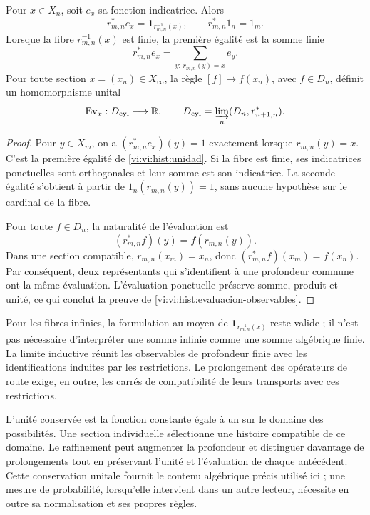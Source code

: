 \begin{lemma}
Pour \(x\in X_n\), soit \(e_x\) sa fonction indicatrice. Alors
\begin{equation}
 r_{m,n}^*e_x=\mathbf1_{r_{m,n}^{-1}(x)},\qquad
 r_{m,n}^*1_n=1_m.
 \label{vi:vi:hist:unidad}
\end{equation}
Lorsque la fibre \(r_{m,n}^{-1}(x)\) est finie, la première égalité est
la somme finie
\[
 r_{m,n}^*e_x=\sum_{y:\,r_{m,n}(y)=x}e_y.
\]
Pour toute section \(x=(x_n)\in X_\infty\), la règle
\([f]\mapsto f(x_n)\), avec \(f\in D_n\), définit un homomorphisme
unital
\begin{equation}
 \operatorname{Ev}_x:D_{\mathrm{cyl}}\longrightarrow\mathbb R,
 \qquad
 D_{\mathrm{cyl}}=\varinjlim_n(D_n,r_{n+1,n}^*).
 \label{vi:vi:hist:evaluacion-observables}
\end{equation}
\end{lemma}
\begin{proof}
Pour \(y\in X_m\), on a
\((r_{m,n}^*e_x)(y)=1\) exactement lorsque \(r_{m,n}(y)=x\).
C’est la première égalité de \eqref{vi:vi:hist:unidad}. Si la fibre est
finie, ses indicatrices ponctuelles sont orthogonales et leur somme est son indicatrice.
La seconde égalité s’obtient à partir de \(1_n(r_{m,n}(y))=1\), sans aucune
hypothèse sur le cardinal de la fibre.

Pour toute \(f\in D_n\), la naturalité de l’évaluation est
\[
 (r_{m,n}^*f)(y)=f(r_{m,n}(y)).
\]
Dans une section compatible, \(r_{m,n}(x_m)=x_n\), donc
\((r_{m,n}^*f)(x_m)=f(x_n)\). Par conséquent, deux représentants qui
s’identifient à une profondeur commune ont la même évaluation.
L’évaluation ponctuelle préserve somme, produit et unité, ce qui conclut
la preuve de \eqref{vi:vi:hist:evaluacion-observables}.
\end{proof}

Pour les fibres infinies, la formulation au moyen de
\(\mathbf1_{r_{m,n}^{-1}(x)}\) reste valide ; il n’est pas nécessaire d’interpréter une somme
infinie comme une somme algébrique finie. La limite inductive réunit les
observables de profondeur finie avec les identifications induites par
les restrictions. Le prolongement des opérateurs de route exige, en outre,
les carrés de compatibilité de leurs transports avec ces restrictions.

L’unité conservée est la fonction constante égale à un sur le domaine des
possibilités. Une section individuelle sélectionne une histoire compatible
de ce domaine. Le raffinement peut augmenter la profondeur et distinguer
davantage de prolongements tout en préservant l’unité et l’évaluation de chaque
antécédent. Cette conservation unitale fournit le contenu algébrique
précis utilisé ici ; une mesure de probabilité, lorsqu’elle intervient dans
un autre lecteur, nécessite en outre sa normalisation et ses propres règles.
